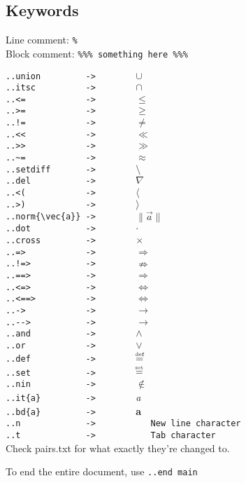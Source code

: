 \documentclass[12pt]{article}
\newcommand{\norm}[1]{\|#1\|}
\newcommand{\pytexdef}{\mathrel{\stackrel{\makebox[0pt]{\mbox{\normalfont\tiny def}}}{=}}}
\newcommand{\pytexset}{\mathrel{\stackrel{\makebox[0pt]{\mbox{\normalfont\tiny set}}}{=}}}
\begin{document}
\begin{flushleft}
\section{Keywords}

Line comment: \verb|%|\\
Block comment: \verb|%|\verb|%|\verb|%|\verb| something here |\verb|%|\verb|%|\verb|%|

\medskip

\verb|..union         ->        |$\cup$\\
\verb|..itsc          ->        |$\cap$\\
\verb|..<=            ->        |$\leq$\\
\verb|..>=            ->        |$\geq$\\
\verb|..!=            ->        |$\neq$\\
\verb|..<<            ->        |$\ll$\\
\verb|..>>            ->        |$\gg$\\
\verb|..~=            ->        |$\approx$\\
\verb|..setdiff       ->        |$\setminus$\\
\verb|..del           ->        |$\nabla$\\
\verb|..<(            ->        |$\langle$\\
\verb|..>)            ->        |$\rangle$\\
\verb|..norm{\vec{a}} ->        |$\norm{\vec{a}}$\\
\verb|..dot           ->        |$\cdot$\\
\verb|..cross         ->        |$\times$\\
\verb|..=>            ->        |$\Rightarrow$\\
\verb|..!=>           ->        |$\nRightarrow$\\
\verb|..==>           ->        |$\Longrightarrow$\\
\verb|..<=>           ->        |$\Leftrightarrow$\\
\verb|..<==>          ->        |$\iff$\\
\verb|..->            ->        |$\to$\\
\verb|..-->           ->        |$\longrightarrow$\\
\verb|..and           ->        |$\wedge$\\
\verb|..or            ->        |$\vee$\\
\verb|..def           ->        |$\pytexdef$\\
\verb|..set           ->        |$\pytexset$\\
\verb|..nin           ->        |$\notin$\\
\bigskip
\verb|..it{a}         ->        |\emph{a}\\
\verb|..bd{a}         ->        |\textbf{a}\\
\verb|..n             ->           New line character |\\
\verb|..t             ->           Tab character|\\

\bigskip
Check pairs.txt for what exactly they're changed to.

\bigskip

To end the entire document, use \verb|..end main|
\end{flushleft}
\end{document}
